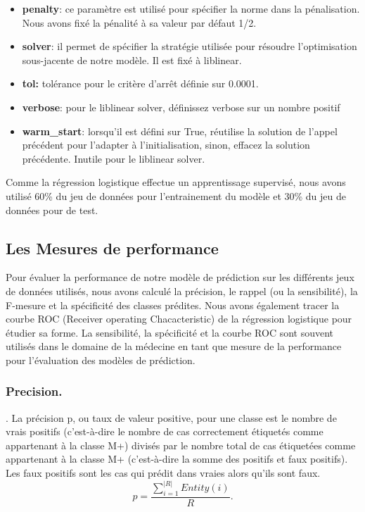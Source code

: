 \begin{itemize}
\item \textbf{penalty}: ce paramètre est utilisé pour spécifier la norme dans la pénalisation. Nous avons fixé la pénalité à sa valeur par défaut 1/2.
\item \textbf{solver}: il permet de spécifier la stratégie utilisée pour résoudre l'optimisation sous-jacente de notre modèle. Il est fixé à liblinear.
\item \textbf{tol:} tolérance pour le critère d'arrêt définie sur 0.0001.
\item \textbf{verbose}: pour le liblinear solver, définissez verbose sur un nombre positif 
\item \textbf{warm\_start}: lorsqu'il est défini sur True, réutilise la solution de l'appel précédent pour l'adapter à l'initialisation, sinon, effacez la solution précédente. Inutile pour le liblinear solver.
\end{itemize}
Comme la régression logistique effectue un apprentissage supervisé, nous avons utilisé 60\%  du jeu de données pour l’entrainement du modèle et 30\%  du jeu de données  pour  de test.
\subsection{Les Mesures de performance}
Pour évaluer la performance de notre modèle de prédiction sur les différents jeux de données utilisés, nous avons calculé la précision, le rappel (ou la sensibilité), 
la F-mesure et la spécificité des classes prédites. Nous avons également tracer la courbe ROC (Receiver operating Chacacteristic) de la régression logistique pour étudier sa forme. La sensibilité, la spécificité et la courbe ROC sont souvent utilisés dans le domaine de la médecine en tant que mesure de la performance  pour l’évaluation des modèles de prédiction.
\subsubsection{Precision.}
\label{precision} . La précision p, ou taux de valeur positive, pour une classe est le nombre de vrais positifs (c’est-à-dire le nombre de cas correctement étiquetés comme appartenant à la classe \textsc{M+}) divisés par le nombre total de cas étiquetées comme appartenant à la classe \textsc{M+} (c’est-à-dire la somme des positifs et faux positifs). Les faux positifs sont les cas qui prédit dans vraies alors qu’ils  sont faux.
\begin{equation}
p=\frac{\sum_{i=1}^{|R|}Entity(i)}{R}.
\end{equation}
 
